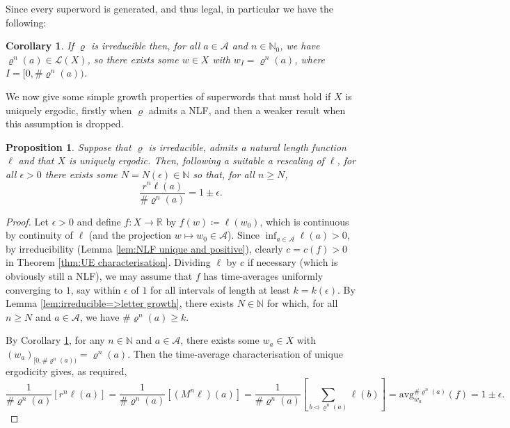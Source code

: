 \documentclass[11pt]{amsart}
\numberwithin{equation}{section}
\theoremstyle{plain}
\newtheorem{proposition}[theorem]{Proposition}
\newtheorem{corollary}[theorem]{Corollary}
\theoremstyle{definition}
\newcommand{\R}{{\mathbb R}}
\newcommand{\N}{{\mathbb N}}
\newcommand{\mc}{\mathcal}
\newcommand{\A}{\mc A}
\newcommand{\sub}{\varrho}
\newcommand{\avg}{\mathrm{avg}}
\newcommand{\lang}{\mathcal{L}}
\begin{document}
Since every superword is generated, and thus legal, in particular we have the following:

\begin{corollary}\label{cor:language contains superwords}
If  \(\sub\) is irreducible then, for all \(a \in \A\) and \(n \in \N_0\), we have \(\sub^n(a) \in \lang(X)\), so there exists some \(w \in X\) with \(w_I = \sub^n(a)\), where \(I = [0,\# \sub^n(a))\).
\end{corollary}

We now give some simple growth properties of superwords that must hold if \(X\) is uniquely ergodic, firstly when \(\sub\) admits a NLF, and then a weaker result when this assumption is dropped.

\begin{proposition}\label{prop:UE superword growth}
Suppose that \(\sub\) is irreducible, admits a natural length function \(\ell\) and that \(X\) is uniquely ergodic. Then, following a suitable a rescaling of \(\ell\), for all \(\epsilon > 0\) there exists some \(N = N(\epsilon) \in \N\) so that, for all \(n \geq N\),
\begin{equation}
\frac{r^n \ell(a)}{ \# \sub^n(a) } = 1 \pm \epsilon .
\end{equation}
\end{proposition}

\begin{proof}
Let \(\epsilon > 0\) and define \(f \colon X \to \R\) by \(f(w) \coloneqq \ell(w_0)\), which is continuous by continuity of \(\ell\) (and the projection \(w \mapsto w_0 \in \A\)). Since \(\inf_{a \in \A} \ell(a) > 0\), by irreducibility (Lemma \ref{lem:NLF unique and positive}), clearly \(c = c(f) > 0\) in Theorem \ref{thm:UE characterisation}. Dividing \(\ell\) by \(c\) if necessary (which is obviously still a NLF), we may assume that \(f\) has time-averages uniformly converging to \(1\), say within \(\epsilon\) of \(1\) for all intervals of length at least \(k = k(\epsilon)\). By Lemma \ref{lem:irreducible=>letter growth}, there exists \(N \in \N\) for which, for all \(n \geq N\) and \(a \in \A\), we have \(\# \sub^n(a) \geq k\).

By Corollary \ref{cor:language contains superwords}, for any \(n \in \N\) and \(a \in \A\), there exists some \(w_a \in X\) with \((w_a)_{[0,\# \sub^n(a))} = \sub^n(a)\). Then the time-average characterisation of unique ergodicity gives, as required,
\begin{equation}
\frac{1}{\# \sub^n(a)} [r^n \ell(a)] = \frac{1}{\# \sub^n(a)} [(M^n \ell)(a)] = \frac{1}{\# \sub^n(a)} \left[ \sum_{b \triangleleft \sub^n(a)} \ell(b) \right] = \avg_{w_a}^{\# \sub^n(a)}(f) = 1 \pm \epsilon .
\end{equation}
\end{proof}
\end{document}
